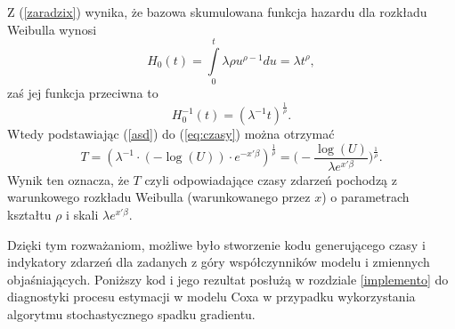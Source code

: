Z (\ref{zaradzix}) wynika, że bazowa skumulowana funkcja hazardu dla rozkładu Weibulla wynosi
\begin{equation}
H_0(t) = \int\limits_{0}^{t} \lambda\rho u^{\rho-1} du = \lambda t^{\rho},
\end{equation}
zaś jej funkcja przeciwna to
\begin{equation}\label{asd}
H_0^{-1}(t)= (\lambda^{-1}t)^{\frac{1}{\rho}}.
\end{equation}
Wtedy podstawiając (\ref{asd}) do (\ref{eq:czasy}) można otrzymać
\begin{equation}
T = (\lambda^{-1}\cdot(-\log(U))\cdot e^{-x'\beta})^{\frac{1}{\rho}} = \Big(-\frac{\log(U)}{\lambda e^{x'\beta}}\Big)^{\frac{1}{\rho}}.
\end{equation}
Wynik ten oznacza, że $T$ czyli odpowiadające czasy zdarzeń pochodzą z warunkowego rozkładu Weibulla (warunkowanego przez $x$) o parametrach kształtu $\rho$ i skali $\lambda  e^{x'\beta}$.

Dzięki tym rozważaniom, możliwe było stworzenie kodu generującego czasy i indykatory zdarzeń dla zadanych z góry współczynników modelu i zmiennych objaśniających. Poniższy kod i jego rezultat posłużą w rozdziale \ref{implemento} do diagnostyki procesu estymacji w modelu Coxa w przypadku wykorzystania algorytmu stochastycznego spadku gradientu.

